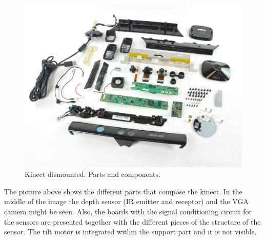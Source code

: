 		\begin{figure}[H]
			\begin{center}
			\includegraphics[scale=0.2]{img/kinect/kinect_parts.eps}
			\caption[Kinect Parts]{Kinect dismounted. Parts and components.}
			\end{center}
		\end{figure}


		The picture above shows the different parts that compose the kinect. In the middle of the image the depth sensor (IR emitter and receptor) and the VGA camera might be seen. Also, the boards with the signal conditioning circuit for the sensors are presented together with the different pieces of the structure of the sensor. The tilt motor is integrated within the support part and it is not visible. 